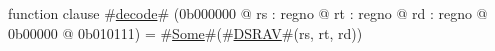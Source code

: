 function clause #\hyperref[zdecode]{decode}# (0b000000 @ rs : regno @ rt : regno @ rd : regno @ 0b00000 @ 0b010111) =
  #\hyperref[zSome]{Some}#(#\hyperref[zDSRAV]{DSRAV}#(rs, rt, rd))
